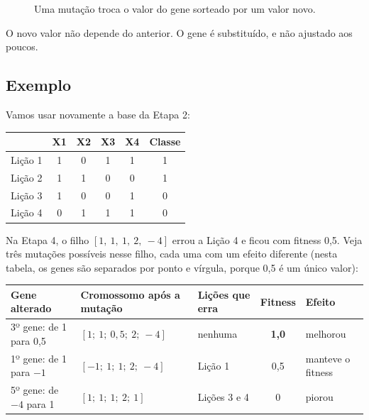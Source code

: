 \documentclass[11pt,a4paper]{article}
\newenvironment{tabela}{\par\nopagebreak[4]\vspace{0.3em}\nopagebreak[4]\begingroup\centering\small}{\par\endgroup\vspace{0.6em}}
\newcommand{\celula}[4]{%
  \node[draw=white,line width=1.2pt,fill=#4,minimum width=1.15cm,minimum height=0.62cm,
    inner sep=0pt,font=\small,text=tinta] at (#1,#2) {#3};}
\begin{document}
\begin{figure}[H]
\centering
{}
\caption{Uma mutação troca o valor do gene sorteado por um valor novo.}
\label{fig:mutacao}
\end{figure}

O novo valor não depende do anterior. O gene é substituído, e não ajustado aos poucos.

\subsection{Exemplo}

Vamos usar novamente a base da Etapa 2:

\begin{tabela}
\begin{tabular}{lccccc}
\toprule
 & X1 & X2 & X3 & X4 & Classe\\
\midrule
Lição 1 & 1 & 0 & 1 & 1 & 1\\
Lição 2 & 1 & 1 & 0 & 0 & 1\\
Lição 3 & 1 & 0 & 0 & 1 & 0\\
Lição 4 & 0 & 1 & 1 & 1 & 0\\
\bottomrule
\end{tabular}
\end{tabela}

Na Etapa 4, o filho $[1,\ 1,\ 1,\ 2,\ -4]$ errou a Lição 4 e ficou com fitness 0,5. Veja três mutações possíveis nesse filho, cada uma com um efeito diferente (nesta tabela, os genes são separados por ponto e vírgula, porque 0,5 é um único valor):

\begin{tabela}
\setlength{\tabcolsep}{4pt}
\begin{tabular}{lllcl}
\toprule
Gene alterado & Cromossomo após a mutação & Lições que erra & Fitness & Efeito\\
\midrule
3º gene: de 1 para 0,5 & $[1;\ 1;\ 0{,}5;\ 2;\ -4]$ & nenhuma & \textbf{1,0} & melhorou\\
1º gene: de 1 para $-1$ & $[-1;\ 1;\ 1;\ 2;\ -4]$ & Lição 1 & 0,5 & manteve o fitness\\
5º gene: de $-4$ para 1 & $[1;\ 1;\ 1;\ 2;\ 1]$ & Lições 3 e 4 & 0 & piorou\\
\bottomrule
\end{tabular}
\end{tabela}
\end{document}
